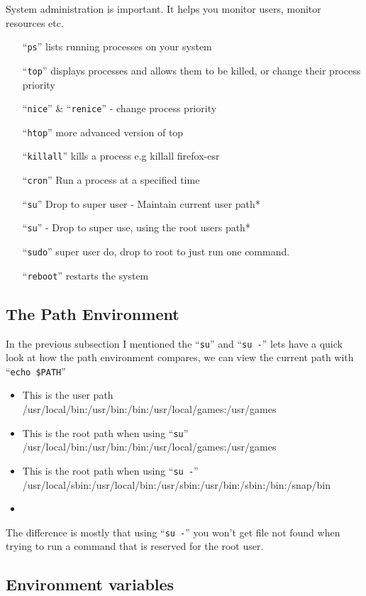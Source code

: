 \documentclass{extbook}
\begin{document}
System administration is important. It helps you monitor users, monitor resources etc.
\begin{itemize}
\item[``\texttt{ps}''] lists running processes on your system
\item[``\texttt{top}''] displays processes and allows them to be killed, or change their process priority
\item[``\texttt{nice}'' \& ``\texttt{renice}''] - change process priority
\item[``\texttt{htop}''] more advanced version of top
\item[``\texttt{killall}''] kills a process e.g killall firefox-esr
\item[``\texttt{cron}''] Run a process at a specified time
\item[``\texttt{su}''] Drop to super user - Maintain current user path*
\item[``\texttt{su}''] - Drop to super use,  using the root users path*
\item[``\texttt{sudo}''] super user do,  drop to root to just run one command.
\item[``\texttt{reboot}''] restarts the system
\end{itemize}


\subsection{The Path Environment}
 In the previous subsection I mentioned the ``\verb|su|'' and ``\verb|su -|'' lets have a quick look at how the path environment compares,  we can view the current path with ``\verb|echo $PATH|''
\begin{itemize}
\item This is the user path /usr/local/bin:/usr/bin:/bin:/usr/local/games:/usr/games
\item This is the root path when using ``\verb|su|'' /usr/local/bin:/usr/bin:/bin:/usr/local/games:/usr/games
\item This is the root path when using ``\verb|su -|'' /usr/local/sbin:/usr/local/bin:/usr/sbin:/usr/bin:/sbin:/bin:/snap/bin
\item
\end{itemize}

The difference is mostly that using ``\verb|su -|'' you won't get file not found when trying to run a command that is reserved for the root user.

\subsection{Environment variables}
\end{document}
